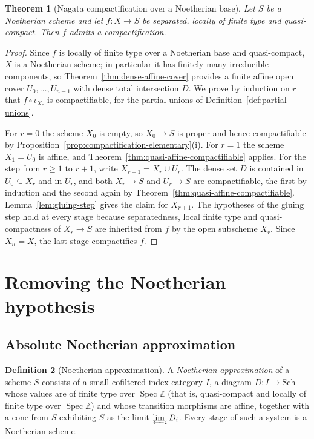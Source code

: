 \documentclass[11pt,a4paper]{article}
\theoremstyle{plain}
\newtheorem{theorem}{Theorem}[section]
\theoremstyle{definition}
\newtheorem{definition}[theorem]{Definition}
\theoremstyle{remark}
\newcommand{\Sch}{\mathrm{Sch}}
\newcommand{\Spec}{\operatorname{Spec}}
\begin{document}
\begin{theorem}[Nagata compactification over a Noetherian base]
\label{thm:noetherian}
Let $S$ be a Noetherian scheme and let $f\colon X\to S$ be separated, locally of
finite type and quasi-compact. Then $f$ admits a compactification.
\end{theorem}

\begin{proof}
Since $f$ is locally of finite type over a Noetherian base and quasi-compact,
$X$ is a Noetherian scheme; in particular it has finitely many irreducible
components, so Theorem~\ref{thm:dense-affine-cover} provides a finite affine
open cover $U_0,\dots,U_{n-1}$ with dense total intersection $D$. We prove by
induction on $r$ that $f\circ\iota_{X_r}$ is compactifiable, for the partial
unions of Definition~\ref{def:partial-unions}.

For $r=0$ the scheme $X_0$ is empty, so $X_0\to S$ is proper and hence
compactifiable by Proposition~\ref{prop:compactification-elementary}(i). For
$r=1$ the scheme $X_1=U_0$ is affine, and
Theorem~\ref{thm:quasi-affine-compactifiable} applies. For the step from $r\ge
1$ to $r+1$, write $X_{r+1}=X_r\cup U_r$. The dense set $D$ is contained in
$U_0\subseteq X_r$ and in $U_r$, and both $X_r\to S$ and $U_r\to S$ are
compactifiable, the first by induction and the second again by
Theorem~\ref{thm:quasi-affine-compactifiable}. Lemma~\ref{lem:gluing-step}
gives the claim for $X_{r+1}$. The hypotheses of the gluing step hold at every
stage because separatedness, local finite type and quasi-compactness of
$X_r\to S$ are inherited from $f$ by the open subscheme $X_r$. Since $X_n=X$,
the last stage compactifies $f$.
\end{proof}

\section{Removing the Noetherian hypothesis}
\label{sec:approximation}

\subsection{Absolute Noetherian approximation}

\begin{definition}[Noetherian approximation]
\label{def:noetherian-approximation}
A \emph{Noetherian approximation} of a scheme $S$ consists of a small cofiltered
index category $I$, a diagram $D\colon I\to\Sch$ whose values are of finite type
over $\Spec\mathbb{Z}$ (that is, quasi-compact and locally of finite type over
$\Spec\mathbb{Z}$) and whose transition morphisms are affine, together with a
cone from $S$ exhibiting $S$ as the limit $\varprojlim_i D_i$. Every stage of
such a system is a Noetherian scheme.
\end{definition}
\end{document}
